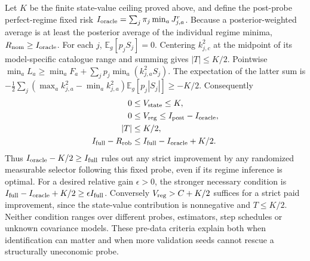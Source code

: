 Let $K$ be the finite state-value ceiling proved above, and define the
post-probe perfect-regime fixed risk
$I_{\rm oracle}=\sum_j\pi_j\min_aJ_{j,a}^{r}$.
Because a posterior-weighted average is at least the posterior average of the
individual regime minima, $R_{\rm nom}\ge I_{\rm oracle}$.
For each $j$, $\mathbb E_g[p_jS_j]=0$.
Centering $k_{j,c}^2$ at the midpoint of its model-specific catalogue range and summing gives $|T|\le K/2$.
Pointwise $\min_aL_a\ge\min_aF_a+\sum_jp_j\min_a(k_{j,a}^2S_j)$.
The expectation of the latter sum is
$-\tfrac12\sum_j(\max_a k_{j,a}^2-\min_a k_{j,a}^2)\mathbb E_g[p_j|S_j|]\ge-K/2$.
Consequently
\begin{align*}
0&\le V_{\rm state}\le K,\\
0&\le V_{\rm reg}\le I_{\rm post}-I_{\rm oracle},\\
|T|&\le K/2,\\
I_{\rm full}-R_{\rm rob}&\le I_{\rm full}-I_{\rm oracle}+K/2.
\end{align*}
Thus $I_{\rm oracle}-K/2\ge I_{\rm full}$ rules out any strict improvement by
any randomized measurable selector following this fixed probe, even if its
regime inference is optimal.
For a desired relative gain $\epsilon>0$, the stronger necessary condition is
$I_{\rm full}-I_{\rm oracle}+K/2\ge\epsilon I_{\rm full}$.
Conversely $V_{\rm reg}>C+K/2$ suffices for a strict paid improvement, since the
state-value contribution is nonnegative and $T\le K/2$.
Neither condition ranges over different probes, estimators, step schedules or
unknown covariance models.
These pre-data criteria explain both when identification can matter and when
more validation seeds cannot rescue a structurally uneconomic probe.
